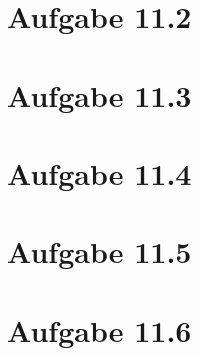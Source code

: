 \documentclass[12pt]{article}
\begin{document}
\section{Aufgabe 11.2}

\section{Aufgabe 11.3}

\section{Aufgabe 11.4}

\section{Aufgabe 11.5}

\section{Aufgabe 11.6}
\end{document}
